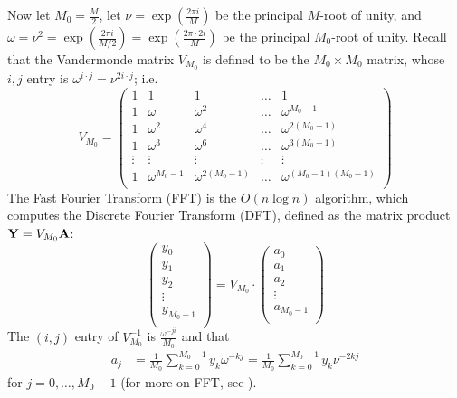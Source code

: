 Now let $M_0=\frac{M}{2}$, let
$\nu=\exp(\frac{2\pi i}{M})$ be the principal $M$-root of unity, and
$\omega=\nu^2=\exp(\frac{2\pi i}{M/2})=\exp(\frac{2\pi \cdot 2i}{M})$ be
the principal $M_0$-root of unity. Recall that the
Vandermonde matrix $V_{M_0}$ is defined to be the
$M_0 \times M_0$ matrix, whose $i,j$ entry is
$\omega^{i \cdot j} = \nu^{2 i \cdot j}$;
i.e.
$$
V_{M_0} = \left(
\begin{array}{rrrrr}
1&1&1&\dots&1\\
1&\omega&\omega^2&\dots&\omega^{M_0-1}\\
1&\omega^2&\omega^4&\dots&\omega^{2(M_0-1)}\\
1&\omega^3&\omega^6&\dots&\omega^{3(M_0-1)}\\
\vdots& \vdots& \vdots& \vdots& \vdots\\
1&\omega^{M_0-1}&\omega^{2(M_0-1)}&\dots&\omega^{(M_0-1)(M_0-1)}\\
\end{array}
\right)
$$
The Fast Fourier Transform (FFT) is the $O(n \log n)$
algorithm, which computes the Discrete Fourier Transform (DFT), defined
as the matrix product ${\bf Y} = V_{M_0} {\bf A}$:
$$
\left(
\begin{array}{l}
y_0\\
y_1\\
y_2\\
\vdots \\
y_{M_0-1}\\
\end{array}
\right)
= V_{M_0} \cdot
\left(
\begin{array}{l}
a_0\\
a_1\\
a_2\\
\vdots \\
a_{M_0-1}\\
\end{array}
\right)
$$
The $(i,j)$ entry of $V_{M_0}^{-1}$ is $\frac{\omega^{-j i}}{M_0}$
and that
\begin{align}
\label{eq:ajdef}
a_j &=\frac{1}{M_0} \sum_{k=0}^{M_0-1} y_k \omega^{-kj}
=\frac{1}{M_0} \sum_{k=0}^{M_0-1} y_k \nu^{-2kj}
\end{align}
for $j=0,\dots,M_0-1$ (for more on FFT, see \cite{cormen}).

